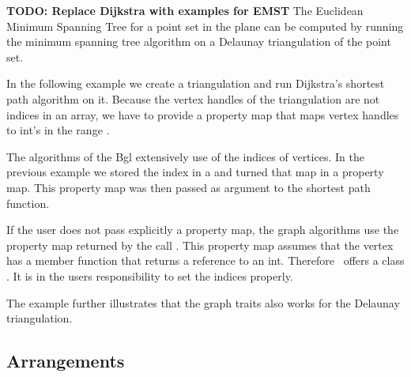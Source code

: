 {\bf TODO: Replace Dijkstra with examples for EMST}
The Euclidean Minimum Spanning Tree for a point set in the plane can be
computed by running the minimum spanning tree algorithm on a Delaunay
triangulation of the point set.




In the following example we create a triangulation and run Dijkstra's shortest path
algorithm on it. Because the vertex handles of the triangulation are not indices
in an array, we have to provide a property map that maps vertex handles to
int's in the range \ccc{[0, t.number_of_vertices())}.




The algorithms of the {\sc Bgl} extensively use of the indices of
vertices. In the previous example we stored the index in a 
and turned that map in a property map. This property map was then
passed as argument to the shortest path function.

If the user does not pass explicitly a property map, the graph algorithms
use the property map returned by the call .
This property map assumes that the vertex has a 
member function  that returns a reference to an int.
Therefore \cgal\ offers a class .
It is in the users responsibility to set the indices properly.

The example further illustrates that the graph traits also works
for the Delaunay triangulation.



\subsection{Arrangements}





